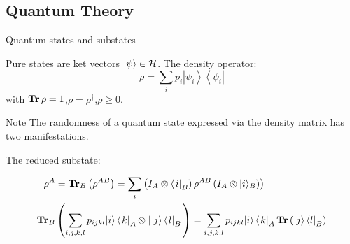 \documentclass{beamer}
\begin{document}
\subsection{Quantum Theory}
\begin{frame}{Quantum states and substates}
\begin{scriptsize}
Pure states are ket vectors $\ket{\psi} \in \mathcal{H}$.
The density operator:
$$
\rho = \sum_{i} p_{i}\left|\psi_{i}\right\rangle\left\langle\psi_{i}\right|
$$
with $\operatorname{\textup{\textbf{Tr}}} \rho=1$,$\rho=\rho^{\dagger}$,$\rho \geq 0$.
\begin{alertblock}{Note}
The randomness of a quantum state expressed via the density matrix has two manifestations.
\end{alertblock}
The reduced substate:
\begin{small}
\begin{align*}
\rho^A &= \operatorname{\textup{\textbf{Tr}}}_{B}\left( \rho^{AB} \right)=
\sum_{i}\left(I_{A} \otimes\left\langle\left. i\right|_{B}\right) \rho^{AB}\left(I_{A} \otimes|i\rangle_{B}\right)\right) \\  \operatorname{\textup{\textbf{Tr}}}_B & \left( \sum_{i, j, k, l} p_{ijkl}|i\rangle\left\langle\left. k\right|_{A} \otimes \mid j\right\rangle\left\langle\left. l\right|_{B}\right. \right) = \sum_{i, j, k, l} p_{ijkl} |i\rangle\left\langle\left. k\right|_{A}  \operatorname{\textup{\textbf{Tr}}} \left(  |j\right\rangle\left\langle l\right|_{B} \right)
\end{align*}
\end{small}
\end{scriptsize}
\end{frame}
\end{document}

